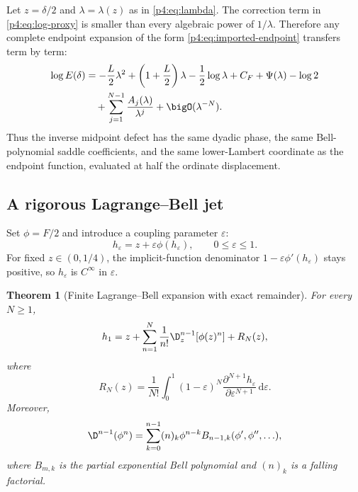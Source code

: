\documentclass[11pt]{article}
\numberwithin{equation}{section}
\newtheorem{theorem}{Theorem}[section]
\theoremstyle{definition}
\theoremstyle{remark}
\newcommand{\dd}{\,\mathrm d}
\begin{document}
\begin{corpusdeductionbox}[title=Lambert--W transfer theorem]
Let $z=\delta/2$ and $\lambda=\lambda(z)$ as in \eqref{p4:eq:lambda}.  The correction term in \eqref{p4:eq:log-proxy} is smaller than every algebraic power of $1/\lambda$.  Therefore any complete endpoint expansion of the form \eqref{p4:eq:imported-endpoint} transfers term by term:
\begin{align}
 \log E(\delta)
 &=-\frac L2\lambda^2
  +\left(1+\frac L2\right)\lambda
  -\frac12\log\lambda
  +C_F+\Psi(\lambda)-\log2
 \notag\\
 &\quad+\sum_{j=1}^{N-1}\frac{A_j(\lambda)}{\lambda^j}
  +\bigO(\lambda^{-N}).
 \label{p4:eq:inverse-lambert-transfer}
\end{align}
Thus the inverse midpoint defect has the same dyadic phase, the same Bell-polynomial saddle coefficients, and the same lower-Lambert coordinate as the endpoint function, evaluated at half the ordinate displacement.
\end{corpusdeductionbox}

\subsection{A rigorous Lagrange--Bell jet}
Set $\phi=F/2$ and introduce a coupling parameter $\varepsilon$:
\begin{equation}
 h_\varepsilon=z+\varepsilon\phi(h_\varepsilon),
 \qquad 0\le\varepsilon\le1.
 \label{p4:eq:coupled-fixed-point}
\end{equation}
For fixed $z\in(0,1/4)$, the implicit-function denominator
$1-\varepsilon\phi'(h_\varepsilon)$ stays positive, so $h_\varepsilon$ is $C^\infty$ in $\varepsilon$.

\begin{theorem}[Finite Lagrange--Bell expansion with exact remainder]
\label{p4:thm:lagrange-bell}
For every $N\ge1$,
\begin{equation}
 h_1=z+\sum_{n=1}^{N}\frac1{n!}
 \D_z^{n-1}\!\left[\phi(z)^n\right]+R_N(z),
 \label{p4:eq:lagrange-finite}
\end{equation}
where
\begin{equation}
 R_N(z)=\frac1{N!}\int_0^1(1-\varepsilon)^N
 \frac{\partial^{N+1}h_\varepsilon}{\partial\varepsilon^{N+1}}\dd\varepsilon.
 \label{p4:eq:lagrange-remainder}
\end{equation}
Moreover,
\begin{equation}
 \D^{n-1}(\phi^n)
 =\sum_{k=0}^{n-1}(n)_k\phi^{n-k}
 B_{n-1,k}(\phi',\phi'',\ldots),
 \label{p4:eq:partial-bell}
\end{equation}
where $B_{m,k}$ is the partial exponential Bell polynomial and $(n)_k$ is a falling factorial.
\end{theorem}
\end{document}
